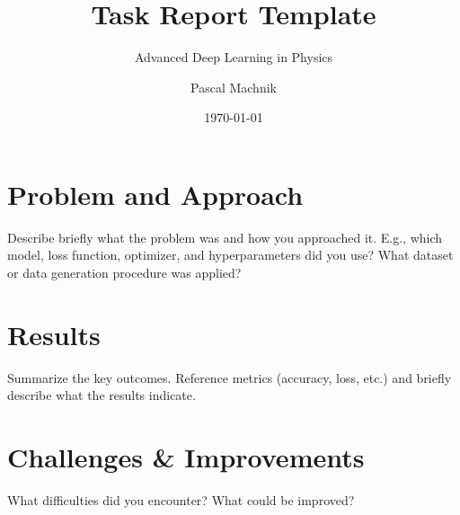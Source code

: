 \documentclass[a4paper, 11pt]{scrartcl}
\title{Task Report Template}
\subtitle{Advanced Deep Learning in Physics}
\author{Pascal Machnik}
\date{\today}
\begin{document}
\maketitle
\thispagestyle{empty}

\section*{Problem and Approach}

Describe briefly what the problem was and how you approached it. E.g., which model, loss function, optimizer, and
hyperparameters did you use? What dataset or data generation procedure was applied?

\section*{Results}

Summarize the key outcomes. Reference metrics (accuracy, loss, etc.) and briefly describe
what the results indicate.

\section*{Challenges \& Improvements}

What difficulties did you encounter? What could be improved?
\end{document}
